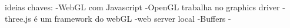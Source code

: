 ideias chaves:
-WebGL com Javascript
-OpenGL trabalha no graphics driver
-three.js é um framework do webGL
-web server local
-Buffers
-
